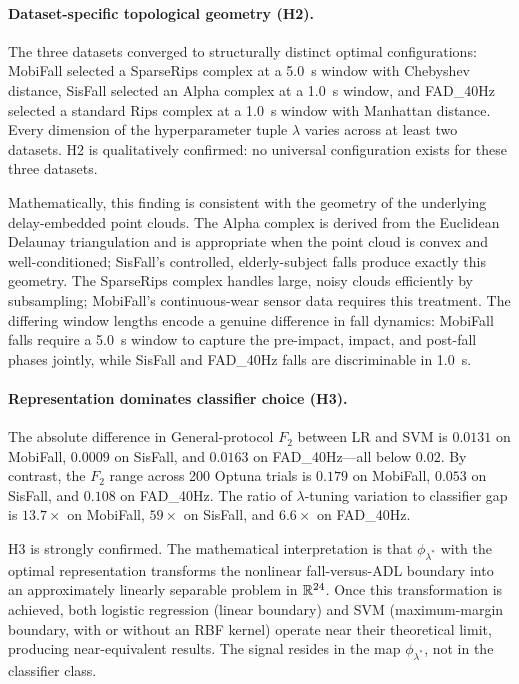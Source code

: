 \paragraph{Dataset-specific topological geometry (H2).}
The three datasets converged to structurally distinct optimal configurations:
MobiFall selected a SparseRips complex at a 5.0~s window with Chebyshev distance,
SisFall selected an Alpha complex at a 1.0~s window, and FAD\_40Hz selected a
standard Rips complex at a 1.0~s window with Manhattan distance.  Every dimension of
the hyperparameter tuple $\lambda$ varies across at least two datasets.  H2 is
qualitatively confirmed: no universal configuration exists for these three datasets.

Mathematically, this finding is consistent with the geometry of the underlying
delay-embedded point clouds.  The Alpha complex is derived from the Euclidean
Delaunay triangulation and is appropriate when the point cloud is convex and
well-conditioned; SisFall's controlled, elderly-subject falls produce exactly this
geometry.  The SparseRips complex handles large, noisy clouds efficiently by
subsampling; MobiFall's continuous-wear sensor data requires this treatment.  The
differing window lengths encode a genuine difference in fall dynamics: MobiFall falls
require a 5.0~s window to capture the pre-impact, impact, and post-fall phases
jointly, while SisFall and FAD\_40Hz falls are discriminable in 1.0~s.

\paragraph{Representation dominates classifier choice (H3).}
The absolute difference in General-protocol $F_2$ between LR and SVM is $0.0131$
on MobiFall, $0.0009$ on SisFall, and $0.0163$ on FAD\_40Hz---all below $0.02$.
By contrast, the $F_2$ range across 200 Optuna trials is $0.179$ on MobiFall,
$0.053$ on SisFall, and $0.108$ on FAD\_40Hz.  The ratio of $\lambda$-tuning
variation to classifier gap is $13.7\times$ on MobiFall, $59\times$ on SisFall,
and $6.6\times$ on FAD\_40Hz.

H3 is strongly confirmed.  The mathematical interpretation is that $\phi_{\lambda^*}$
with the optimal representation transforms the nonlinear fall-versus-ADL boundary
into an approximately linearly separable problem in $\mathbb{R}^{24}$.  Once this
transformation is achieved, both logistic regression (linear boundary) and SVM
(maximum-margin boundary, with or without an RBF kernel) operate near their
theoretical limit, producing near-equivalent results.  The signal resides in the
map $\phi_{\lambda^*}$, not in the classifier class.

